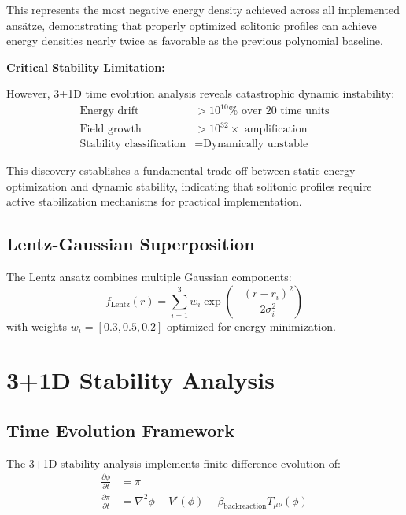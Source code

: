 \documentclass[11pt,a4paper]{article}
\begin{document}
\begin{table}[h]
This represents the most negative energy density achieved across all implemented ansätze, demonstrating that properly optimized solitonic profiles can achieve energy densities nearly twice as favorable as the previous polynomial baseline.

\textbf{Critical Stability Limitation:}

However, 3+1D time evolution analysis reveals catastrophic dynamic instability:
\begin{align}
\text{Energy drift} &> 10^{10}\% \text{ over 20 time units} \\
\text{Field growth} &> 10^{32} \times \text{ amplification} \\
\text{Stability classification} &= \text{Dynamically unstable}
\end{align}

This discovery establishes a fundamental trade-off between static energy optimization and dynamic stability, indicating that solitonic profiles require active stabilization mechanisms for practical implementation.

\subsection{Lentz-Gaussian Superposition}

The Lentz ansatz combines multiple Gaussian components:
\begin{equation}
f_{\text{Lentz}}(r) = \sum_{i=1}^{3} w_i \exp\left(-\frac{(r - r_i)^2}{2\sigma_i^2}\right)
\end{equation}
with weights $w_i = [0.3, 0.5, 0.2]$ optimized for energy minimization.

\section{3+1D Stability Analysis}

\subsection{Time Evolution Framework}

The 3+1D stability analysis implements finite-difference evolution of:
\begin{align}
\frac{\partial\phi}{\partial t} &= \pi \\
\frac{\partial\pi}{\partial t} &= \nabla^2\phi - V'(\phi) - \beta_{\text{backreaction}} T_{\mu\nu}(\phi)
\end{align}


\end{table}
\end{document}
